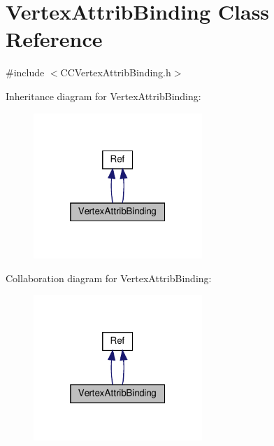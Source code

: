 \hypertarget{classVertexAttribBinding}{}\section{Vertex\+Attrib\+Binding Class Reference}
\label{classVertexAttribBinding}


{\ttfamily \#include $<$C\+C\+Vertex\+Attrib\+Binding.\+h$>$}



Inheritance diagram for Vertex\+Attrib\+Binding\+:
\nopagebreak
\begin{figure}[H]
\begin{center}
\leavevmode
\includegraphics[width=181pt]{classVertexAttribBinding__inherit__graph}
\end{center}
\end{figure}


Collaboration diagram for Vertex\+Attrib\+Binding\+:
\nopagebreak
\begin{figure}[H]
\begin{center}
\leavevmode
\includegraphics[width=181pt]{classVertexAttribBinding__coll__graph}
\end{center}
\end{figure}
